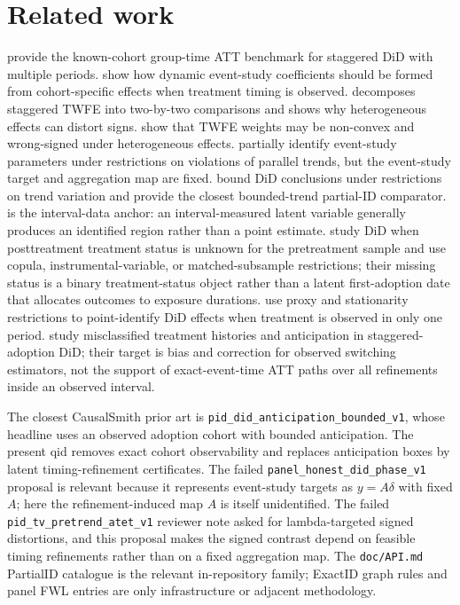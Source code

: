 \documentclass[11pt]{article}
\theoremstyle{definition}
\theoremstyle{plain}
\theoremstyle{remark}
\begin{document}
\section{Related work}
\citet{CallawaySantAnna2021} provide the known-cohort group-time ATT benchmark for staggered DiD with multiple periods. \citet{SunAbraham2021} show how dynamic event-study coefficients should be formed from cohort-specific effects when treatment timing is observed. \citet{GoodmanBacon2021} decomposes staggered TWFE into two-by-two comparisons and shows why heterogeneous effects can distort signs. \citet{DeChaisemartinDHaultfoeuille2020} show that TWFE weights may be non-convex and wrong-signed under heterogeneous effects. \citet{RambachanRoth2023} partially identify event-study parameters under restrictions on violations of parallel trends, but the event-study target and aggregation map are fixed. \citet{ManskiPepper2018} bound DiD conclusions under restrictions on trend variation and provide the closest bounded-trend partial-ID comparator. \citet{ManskiTamer2002} is the interval-data anchor: an interval-measured latent variable generally produces an identified region rather than a point estimate. \citet[pp.~185--186]{FanManzanares2017} study DiD when posttreatment treatment status is unknown for the pretreatment sample and use copula, instrumental-variable, or matched-subsample restrictions; their missing status is a binary treatment-status object rather than a latent first-adoption date that allocates outcomes to exposure durations. \citet{BotosaruGutierrez2018} use proxy and stationarity restrictions to point-identify DiD effects when treatment is observed in only one period. \citet[Sec.~2]{AugustinGutknechtLiu2025} study misclassified treatment histories and anticipation in staggered-adoption DiD; their target is bias and correction for observed switching estimators, not the support of exact-event-time ATT paths over all refinements inside an observed interval.

The closest CausalSmith prior art is \texttt{pid\_did\_anticipation\_bounded\_v1}, whose headline uses an observed adoption cohort with bounded anticipation. The present qid removes exact cohort observability and replaces anticipation boxes by latent timing-refinement certificates. The failed \texttt{panel\_honest\_did\_phase\_v1} proposal is relevant because it represents event-study targets as \(y=A\delta\) with fixed \(A\); here the refinement-induced map \(A\) is itself unidentified. The failed \texttt{pid\_tv\_pretrend\_atet\_v1} reviewer note asked for lambda-targeted signed distortions, and this proposal makes the signed contrast depend on feasible timing refinements rather than on a fixed aggregation map. The \texttt{doc/API.md} PartialID catalogue is the relevant in-repository family; ExactID graph rules and panel FWL entries are only infrastructure or adjacent methodology.
\end{document}
